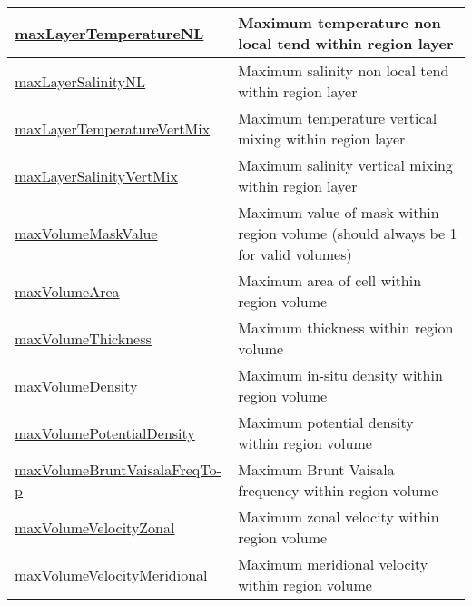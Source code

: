 {\begin{center}
\begin{longtable}{| p{2.0in} | p{4.0in} |}
    \hline
    \hyperref[subsec:var_sec_layerVolumeWeightedAverageAM_maxLayerTemperatureNL]{maxLayerTemperatureNL} & Maximum temperature non local tend within region layer \\
    \hline
    \hyperref[subsec:var_sec_layerVolumeWeightedAverageAM_maxLayerSalinityNL]{maxLayerSalinityNL} & Maximum salinity non local tend within region layer \\
    \hline
    \hyperref[subsec:var_sec_layerVolumeWeightedAverageAM_maxLayerTemperatureVertMix]{maxLayerTemperatureVertMix} & Maximum temperature vertical mixing within region layer \\
    \hline
    \hyperref[subsec:var_sec_layerVolumeWeightedAverageAM_maxLayerSalinityVertMix]{maxLayerSalinityVertMix} & Maximum salinity vertical mixing within region layer \\
    \hline
    \hyperref[subsec:var_sec_layerVolumeWeightedAverageAM_maxVolumeMaskValue]{maxVolumeMaskValue} & Maximum value of mask within region volume (should always be 1 for valid volumes) \\
    \hline
    \hyperref[subsec:var_sec_layerVolumeWeightedAverageAM_maxVolumeArea]{maxVolumeArea} & Maximum area of cell within region volume \\
    \hline
    \hyperref[subsec:var_sec_layerVolumeWeightedAverageAM_maxVolumeThickness]{maxVolumeThickness} & Maximum thickness within region volume \\
    \hline
    \hyperref[subsec:var_sec_layerVolumeWeightedAverageAM_maxVolumeDensity]{maxVolumeDensity} & Maximum in-situ density within region volume \\
    \hline
    \hyperref[subsec:var_sec_layerVolumeWeightedAverageAM_maxVolumePotentialDensity]{maxVolumePotentialDensity} & Maximum potential density within region volume \\
    \hline
    \hyperref[subsec:var_sec_layerVolumeWeightedAverageAM_maxVolumeBruntVaisalaFreqTop]{maxVolumeBruntVaisalaFreqTo-}\hyperref[subsec:var_sec_layerVolumeWeightedAverageAM_maxVolumeBruntVaisalaFreqTop]{p}  & Maximum Brunt Vaisala frequency within region volume \\
    \hline
    \hyperref[subsec:var_sec_layerVolumeWeightedAverageAM_maxVolumeVelocityZonal]{maxVolumeVelocityZonal} & Maximum zonal velocity within region volume \\
    \hline
    \hyperref[subsec:var_sec_layerVolumeWeightedAverageAM_maxVolumeVelocityMeridional]{maxVolumeVelocityMeridional} & Maximum meridional velocity within region volume \\

\end{longtable}
\end{center}}
